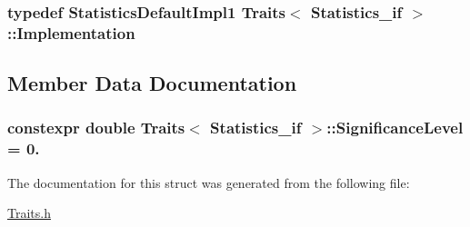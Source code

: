 \subsubsection[{\texorpdfstring{Implementation}{Implementation}}]{\setlength{\rightskip}{0pt plus 5cm}typedef {\bf Statistics\+Default\+Impl1} {\bf Traits}$<$ {\bf Statistics\+\_\+if} $>$\+::{\bf Implementation}}\hypertarget{struct_traits_3_01_statistics__if_01_4_a885cb965f65b240ad3ff46bb1278bb2d}{}\label{struct_traits_3_01_statistics__if_01_4_a885cb965f65b240ad3ff46bb1278bb2d}


\subsection{Member Data Documentation}
\subsubsection[{\texorpdfstring{Significance\+Level}{SignificanceLevel}}]{\setlength{\rightskip}{0pt plus 5cm}constexpr double {\bf Traits}$<$ {\bf Statistics\+\_\+if} $>$\+::Significance\+Level = 0.\hspace{0.3cm}{\ttfamily [static]}}\hypertarget{struct_traits_3_01_statistics__if_01_4_a69e22343c5444e5e557bbaf85b3b3d8b}{}\label{struct_traits_3_01_statistics__if_01_4_a69e22343c5444e5e557bbaf85b3b3d8b}


The documentation for this struct was generated from the following file\+:\begin{DoxyCompactItemize}
\item 
\hyperlink{_traits_8h}{Traits.\+h}\end{DoxyCompactItemize}
